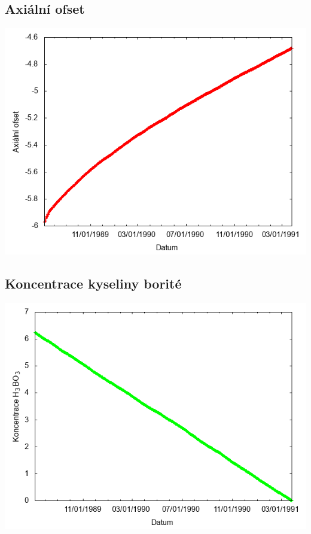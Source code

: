 \documentclass[a4paper,twoside,11pt]{article}
\begin{document}
\subsection*{Axiální ofset}
\begin{center}
\includegraphics[width=.8\textwidth]{graphs/Disneyland_11_ao.png}
\end{center}

\subsection*{Koncentrace kyseliny borité}
\begin{center}
\includegraphics[width=.8\textwidth]{graphs/Disneyland_11_bc.png}
\end{center}
\end{document}
